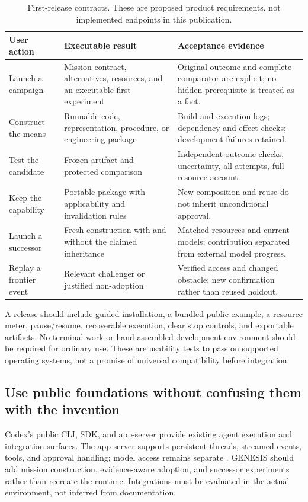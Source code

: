 \documentclass[11pt,letterpaper]{article}
\theoremstyle{remark}\newtheorem{remark}{Remark}[section]
\begin{document}
\begin{table}[htbp]
\caption{First-release contracts. These are proposed product requirements, not implemented endpoints in this publication.}
\label{tab:product}
\begin{tabularx}{\linewidth}{P{2.8cm}YY}
\toprule
\textbf{User action}&\textbf{Executable result}&\textbf{Acceptance evidence}\\\midrule
Launch a campaign&Mission contract, alternatives, resources, and an executable first experiment&Original outcome and complete comparator are explicit; no hidden prerequisite is treated as a fact.\\
Construct the means&Runnable code, representation, procedure, or engineering package&Build and execution logs; dependency and effect checks; development failures retained.\\
Test the candidate&Frozen artifact and protected comparison&Independent outcome checks, uncertainty, all attempts, full resource account.\\
Keep the capability&Portable package with applicability and invalidation rules&New composition and reuse do not inherit unconditional approval.\\
Launch a successor&Fresh construction with and without the claimed inheritance&Matched resources and current models; contribution separated from external model progress.\\
Replay a frontier event&Relevant challenger or justified non-adoption&Verified access and changed obstacle; new confirmation rather than reused holdout.\\\bottomrule
\end{tabularx}
\end{table}

A release should include guided installation, a bundled public example, a resource meter, pause/resume, recoverable execution, clear stop controls, and exportable artifacts. No terminal work or hand-assembled development environment should be required for ordinary use. These are usability tests to pass on supported operating systems, not a promise of universal compatibility before integration.

\subsection{Use public foundations without confusing them with the invention}
Codex's public CLI, SDK, and app-server provide existing agent execution and integration surfaces. The app-server supports persistent threads, streamed events, tools, and approval handling; model access remains separate \citep{codex}. GENESIS should add mission construction, evidence-aware adoption, and successor experiments rather than recreate the runtime. Integrations must be evaluated in the actual environment, not inferred from documentation.
\end{document}
